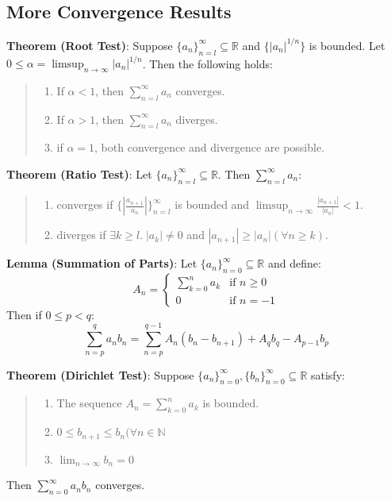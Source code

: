 \documentclass[11pt]{article}
\begin{document}
\subsection{More Convergence Results}


\textbf{Theorem (Root Test)}: Suppose $\{a_n\}_{n=l}^\infty \subseteq \mathbb{R}$ and $\{|a_n|^{1/n}\}$ is bounded. Let $0 \leq \alpha = \limsup_{n \to \infty} |a_n|^{1/n}$. Then the following holds:
\begin{quote}\vspace{-0.3cm}
	\begin{enumerate}
	\item If $\alpha < 1$, then $\sum_{n=l}^\infty a_n$ converges.
	\item If $\alpha > 1$, then $\sum_{n=l}^\infty a_n$ diverges.
	\item if $\alpha = 1$, both convergence and divergence are possible.
	\end{enumerate}
\end{quote}

\textbf{Theorem (Ratio Test)}: Let $\{a_n\}_{n=l}^\infty \subseteq \mathbb{R}$. Then $\sum_{n=l}^\infty a_n$:
\begin{quote}\vspace{-0.3cm}
	\begin{enumerate}
	\item converges if $\{|\frac{a_{n+1}}{a_n}|\}_{n=l}^\infty$ is bounded and $\limsup_{n \to \infty} \frac{|a_{n+1}|}{|a_n|} < 1$.
	\item diverges if $\exists k \geq l.\; |a_k| \neq 0$ and $|a_{n+1}| \geq |a_n| (\forall n \geq k)$.
	\end{enumerate}
\end{quote}

\textbf{Lemma (Summation of Parts)}: Let $\{a_n\}_{n=0}^\infty \subseteq \mathbb{R}$ and define:
\[
A_n =
  \begin{cases}
   \sum_{k=0}^n a_k & \text{if } n \geq 0 \\
   0 & \text{if } n = -1
  \end{cases}
\]
Then if $0 \leq p < q$:
\begin{displaymath}
\sum_{n=p}^q a_nb_n = \sum_{n=p}^{q-1} A_n(b_n - b_{n+1}) + A_qb_q - A_{p-1}b_p
\end{displaymath}

\textbf{Theorem (Dirichlet Test)}: Suppose $\{a_n\}_{n=0}^\infty, \{b_n\}_{n=0}^\infty \subseteq \mathbb{R}$ satisfy:
\begin{quote}\vspace{-0.3cm}
	\begin{enumerate}
	\item The sequence $A_n = \sum_{k=0}^n a_k$ is bounded.
	\item $0 \leq b_{n+1} \leq b_n (\forall n \in \mathbb{N}$
	\item $\lim_{n \to \infty} b_n = 0$
	\end{enumerate}
\end{quote}
Then $\sum_{n=0}^\infty a_nb_n$ converges.
\end{document}
